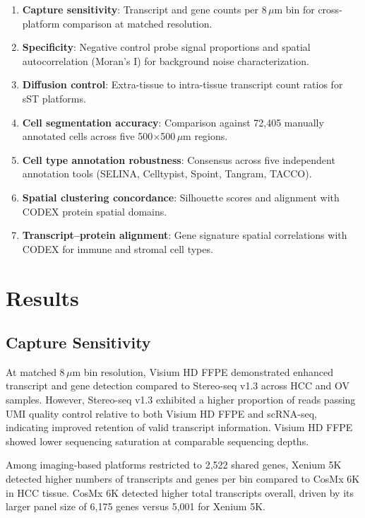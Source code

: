 \documentclass[11pt]{article}
\begin{document}
\begin{enumerate}
    \item \textbf{Capture sensitivity}: Transcript and gene counts per 8\,$\mu$m bin for cross-platform comparison at matched resolution.
    \item \textbf{Specificity}: Negative control probe signal proportions and spatial autocorrelation (Moran's I) for background noise characterization.
    \item \textbf{Diffusion control}: Extra-tissue to intra-tissue transcript count ratios for sST platforms.
    \item \textbf{Cell segmentation accuracy}: Comparison against 72,405 manually annotated cells across five 500$\times$500\,$\mu$m regions.
    \item \textbf{Cell type annotation robustness}: Consensus across five independent annotation tools (SELINA, Celltypist, Spoint, Tangram, TACCO).
    \item \textbf{Spatial clustering concordance}: Silhouette scores and alignment with CODEX protein spatial domains.
    \item \textbf{Transcript--protein alignment}: Gene signature spatial correlations with CODEX for immune and stromal cell types.
\end{enumerate}

\section{Results}

\subsection{Capture Sensitivity}

At matched 8\,$\mu$m bin resolution, Visium HD FFPE demonstrated enhanced transcript and gene detection compared to Stereo-seq v1.3 across HCC and OV samples. However, Stereo-seq v1.3 exhibited a higher proportion of reads passing UMI quality control relative to both Visium HD FFPE and scRNA-seq, indicating improved retention of valid transcript information. Visium HD FFPE showed lower sequencing saturation at comparable sequencing depths.

Among imaging-based platforms restricted to 2,522 shared genes, Xenium 5K detected higher numbers of transcripts and genes per bin compared to CosMx 6K in HCC tissue. CosMx 6K detected higher total transcripts overall, driven by its larger panel size of 6,175 genes versus 5,001 for Xenium 5K.
\end{document}
